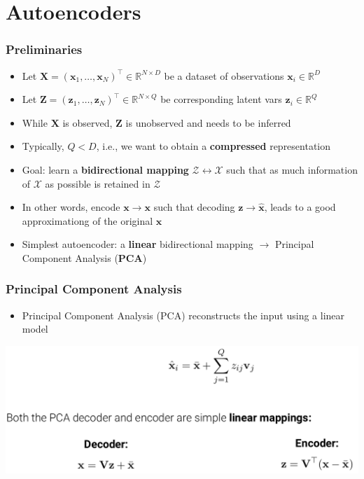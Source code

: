 \documentclass[10pt,aspectratio=169]{beamer}
\begin{document}
\section{Autoencoders}


\begin{frame}
  \frametitle{Preliminaries}
\small{
\begin{itemize}[<+->]
\item Let $\mathbf{X}=(\mathbf{x}_1,\hdots,\mathbf{x}_N)^\top\in\mathbb{R}^{N\times D}$ be a dataset of observations $\mathbf{x}_i\in\mathbb{R}^D$
\item Let $\mathbf{Z}=(\mathbf{z}_1,\hdots,\mathbf{z}_N)^\top\in\mathbb{R}^{N\times Q}$ be corresponding latent vars $\mathbf{z}_i\in\mathbb{R}^Q$
\item While $\mathbf{X}$ is observed, $\mathbf{Z}$ is unobserved and needs to be inferred
\item Typically, $Q<D$, i.e., we want to obtain a \textbf{compressed} representation
\item Goal: learn a \textbf{bidirectional mapping} $\mathcal{Z}\leftrightarrow\mathcal{X}$ such that
as much information of $\mathcal{X}$ as possible is retained in $\mathcal{Z}$
\item In other words, encode $\mathbf{x}\rightarrow\mathbf{x}$ such that decoding
$\mathbf{z}\rightarrow\hat{\mathbf{x}}$, leads to a good approximationg of the
original $\mathbf{x}$
\item Simplest autoencoder: a \textbf{linear} bidirectional mapping $\rightarrow$ Principal Component Analysis (\textbf{PCA}) 
\end{itemize}
}
\end{frame}

\begin{frame}
  \frametitle{Principal Component Analysis}
\begin{itemize}
\item Principal Component Analysis (PCA) reconstructs the input using a linear model 
\end{itemize}
\begin{center}
\includegraphics[width=.9\textwidth]{images/s10}
\end{center}
\end{frame}
\end{document}
